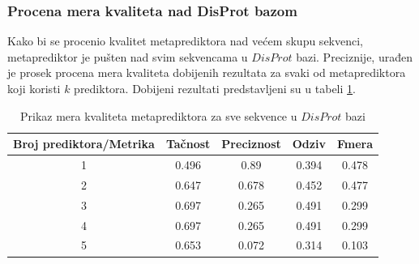 \subsubsection{Procena mera kvaliteta nad DisProt bazom}
Kako bi se procenio kvalitet metaprediktora nad većem skupu sekvenci, metaprediktor je pušten nad svim sekvencama u $DisProt$ bazi. Preciznije, urađen je prosek procena mera kvaliteta dobijenih rezultata za svaki od metaprediktora koji koristi $k$ prediktora. Dobijeni rezultati predstavljeni su u tabeli \ref{table:finalni}.

\begin{table}[H]
\centering
 \begin{tabular}{||c c c c c||} 
 \hline
 Broj prediktora/Metrika & Tačnost & Preciznost & Odziv & Fmera\\ [0.5ex] 
 \hline\hline
 1 & 0.496 & 0.89 & 0.394 & 0.478 \\ 
 \hline
 2 & 0.647 & 0.678 & 0.452 & 0.477\\
 \hline
 3 & 0.697 & 0.265 & 0.491 & 0.299 \\
 \hline
 4 & 0.697 & 0.265 & 0.491 & 0.299\\
 \hline
 5 & 0.653 & 0.072 & 0.314 & 0.103\\ [1ex] 
 \hline
\end{tabular}
\caption{Prikaz mera kvaliteta metaprediktora za sve sekvence u $DisProt$ bazi}
\label{table:finalni}
\end{table}

    
